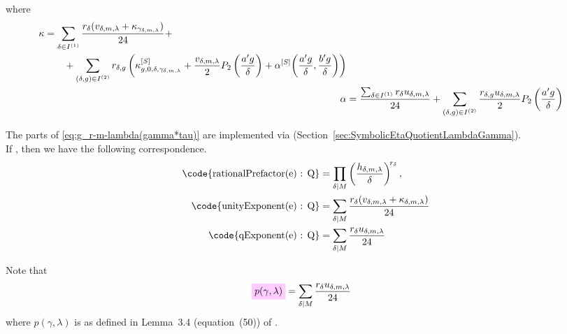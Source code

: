 \documentclass{article}
\begin{document}
where
\begin{align}
  \begin{split}
  \kappa
    &=
    \sum_{\delta\in I^{(1)}} \frac{r_\delta(v_{\delta,m,\lambda} +
      \kappa_{\gamma_{\delta,m,\lambda}})}{24} +
    \\
    &\qquad
    +
    \sum_{(\delta,g)\in I^{(2)}}
      r_{\delta,g}\left(\kappa_{g,0,\delta,\gamma_{\delta,m,\lambda}}^{[S]}
      +
      \frac{v_{\delta,m,\lambda}}{2} P_2\left(\frac{a' g}{\delta}\right)
      +
      \alpha^{[S]}\!\left(\frac{a' g}{\delta},\frac{b' g}{\delta}\right)
    \right)
  \end{split}
  \label{eq:g_r-m-lambda(gamma*tau)-unityExponent}
  \\
  \alpha
    &=
    \frac{\sum_{\delta\in I^{(1)}} r_\delta u_{\delta,m,\lambda}}{24}
      +
      \sum_{(\delta,g)\in I^{(2)}}
        \frac{r_{\delta,g} u_{\delta,m,\lambda}}{2}
        P_2\left(\frac{a' g}{\delta}\right)
  \label{eq:g_r-m-lambda(gamma*tau)-qExponent}
\end{align}







The parts of \eqref{eq:g_r-m-lambda(gamma*tau)} are implemented via
\textcolor{blue}{}
(Section~\ref{sec:SymbolicEtaQuotientLambdaGamma}).
\\
If , then we have the
following correspondence.
\begin{align*}
  \text{\code{rationalPrefactor(e) : Q}}
  &=
    \divisorprod{M}
    \left(\frac{h_{\delta,m,\lambda}}{\delta}\right)^{\!r_\delta},
  \\
  \text{\code{unityExponent(e) : Q}}
  &=
    \divisorsum{M} \frac{r_\delta(v_{\delta,m,\lambda} + \kappa_{\delta,m,\lambda})}{24}
  \\
  \text{\code{qExponent(e) : Q}}
  &=
    \divisorsum{M} \frac{r_\delta u_{\delta,m,\lambda}}{24}
\end{align*}

Note that
\begin{align}
  \defineNotation[p-gamma-lambda]{p(\gamma,\lambda)}
  &=
    \divisorsum{M} \frac{r_\delta u_{\delta,m,\lambda}}{24}
\end{align}
where $p(\gamma,\lambda)$ is as defined in Lemma~3.4 (equation~(50))
of \cite{Radu_AlgorithmicApproachRamanujanCongruences_2009}.
\end{document}
